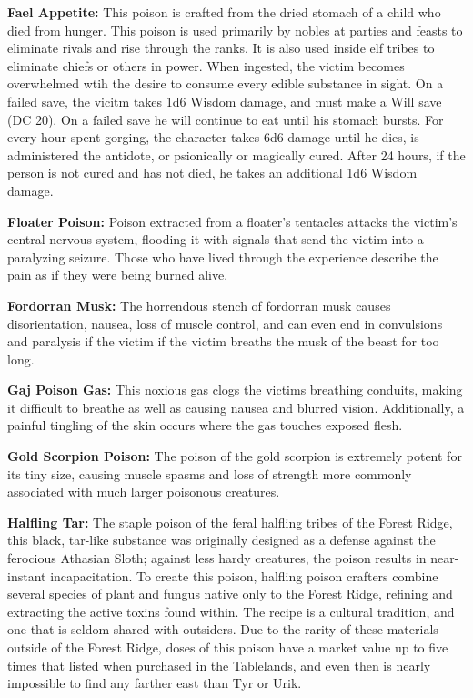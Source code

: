 \textbf{Fael Appetite:} This poison is crafted from the dried stomach of a child who died from hunger. This poison is used primarily by nobles at parties and feasts to eliminate rivals and rise through the ranks. It is also used inside elf tribes to eliminate chiefs or others in power. When ingested, the victim becomes overwhelmed wtih the desire to consume every edible substance in sight. On a failed save, the vicitm takes 1d6 Wisdom damage, and must make a Will save (DC 20). On a failed save he will continue to eat until his stomach bursts. For every hour spent gorging, the character takes 6d6 damage until he dies, is administered the antidote, or psionically or magically cured. After 24 hours, if the person is not cured and has not died, he takes an additional 1d6 Wisdom damage.

\textbf{Floater Poison:} Poison extracted from a floater's tentacles attacks the victim's central nervous system, flooding it with signals that send the victim into a paralyzing seizure. Those who have lived through the experience describe the pain as if they were being burned alive.

\textbf{Fordorran Musk:} The horrendous stench of fordorran musk causes disorientation, nausea, loss of muscle control, and can even end in convulsions and paralysis if the victim if the victim breaths the musk of the beast for too long. 

\textbf{Gaj Poison Gas:} This noxious gas clogs the victims breathing conduits, making it difficult to breathe as well as causing nausea and blurred vision. Additionally, a painful tingling of the skin occurs where the gas touches exposed flesh.

\textbf{Gold Scorpion Poison:} The poison of the gold scorpion is extremely potent for its tiny size, causing muscle spasms and loss of strength more commonly associated with much larger poisonous creatures.

\textbf{Halfling Tar:} The staple poison of the feral halfling tribes of the Forest Ridge, this black, tar-like substance was originally designed as a defense against the ferocious Athasian Sloth; against less hardy creatures, the poison results in near-instant incapacitation. To create this poison, halfling poison crafters combine several species of plant and fungus native only to the Forest Ridge, refining and extracting the active toxins found within. The recipe is a cultural tradition, and one that is seldom shared with outsiders. Due to the rarity of these materials outside of the Forest Ridge, doses of this poison have a market value up to five times that listed when purchased in the Tablelands, and even then is nearly impossible to find any farther east than Tyr or Urik.

